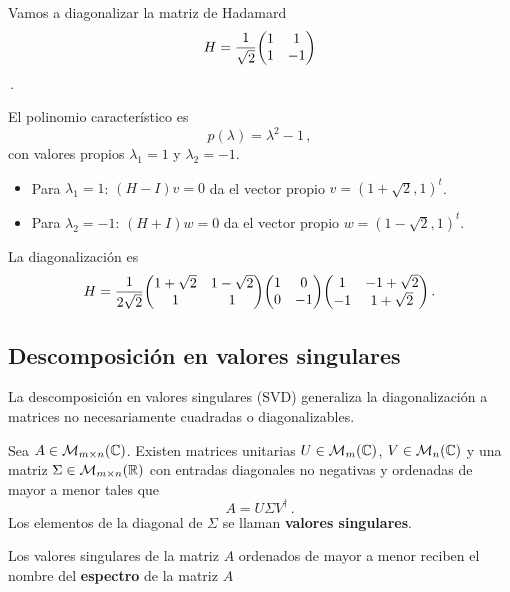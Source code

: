 \begin{eje}
  Vamos a diagonalizar la matriz de Hadamard
  \[
    H=\frac{1}{\sqrt{2}}\mqty(1&1\\1&-1)
  \]\,.

  El polinomio característico es
  \[
    p(\lambda) = \lambda^2 - 1\,,
  \]
  con valores propios $\lambda_1=1$ y $\lambda_2=-1$.

  \begin{itemize}
    \item Para $\lambda_1=1$: $(H-I)v=0$ da el vector propio $v=(1+\sqrt{2},1)^t$.

    \item Para $\lambda_2=-1$: $(H+I)w=0$ da el vector propio $w=(1-\sqrt{2},1)^t$.
  \end{itemize}

  La diagonalización es
  \[
    H =\frac{1}{2\sqrt{2}} \mqty(1+\sqrt{2} & 1-\sqrt{2} \\ 1 & 1)\mqty(1&0\\0&-1)\mqty(1 & -1 + \sqrt{2}\\ -1 & 1+\sqrt{2})\,.
  \]
\end{eje}

\subsection{Descomposición en valores singulares}

La descomposición en valores singulares (SVD) generaliza la diagonalización a matrices no necesariamente cuadradas o diagonalizables.

\begin{prop}
  Sea $A\in\mathcal{M}_{m\times n}(\mathbb{C})$. Existen matrices unitarias $U\in\mathcal{M}_m(\mathbb{C})$, $V\in\mathcal{M}_n(\mathbb{C})$ y una matriz $\Sigma\in\mathcal{M}_{m\times n}(\mathbb{R})$ con entradas diagonales no negativas y ordenadas de mayor a menor tales que
  \[
    A = U\Sigma V^\dagger\,.
  \]
  Los elementos de la diagonal de $\Sigma$ se llaman \textbf{valores singulares}.
\end{prop}

\begin{defi}
  Los valores singulares de la matriz $A$ ordenados de mayor a menor reciben el nombre del \textbf{espectro} de la matriz $A$
\end{defi}

